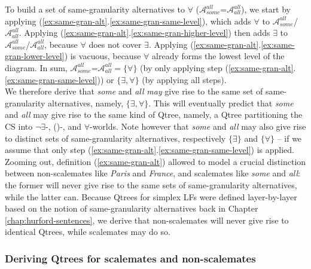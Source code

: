 	To build a set of same-granularity alternatives to $\forall$ ($\mathcal{A}_{\textit{some}}^{\textit{all}}$=$\mathcal{A}_{\textit{all}}^{\textit{all}}$), we start by applying (\ref{ex:same-gran-alt}.\ref{ex:same-gran-same-level}), which adds $\forall$ to $\mathcal{A}_{\textit{some}}^{\textit{all}}$/$\mathcal{A}_{\textit{all}}^{\textit{all}}$. Applying (\ref{ex:same-gran-alt}.\ref{ex:same-gran-higher-level}) then adds $\exists$ to $\mathcal{A}_{\textit{some}}^{\textit{all}}$/$\mathcal{A}_{\textit{all}}^{\textit{all}}$, because $\forall$ does not cover $\exists$. Applying (\ref{ex:same-gran-alt}.\ref{ex:same-gran-lower-level}) is vacuous, because $\forall$ already forms the lowest level of the diagram. In sum, $\mathcal{A}_{\textit{some}}^{\textit{all}}$=$\mathcal{A}_{\textit{all}}^{\textit{all}} = \lbrace\forall\rbrace$ (by only applying step (\ref{ex:same-gran-alt}.\ref{ex:same-gran-same-level})) or $\lbrace\exists, \forall\rbrace$ (by applying all steps).\\
	
	
	We therefore derive that \textit{some} and \textit{all} \textit{may} give rise to the same set of same-granularity alternatives, namely, $\lbrace \exists, \forall\rbrace$. This will eventually predict that \textit{some} and \textit{all} may give rise to the same kind of Qtree, namely, a Qtree partitioning the CS into $\neg\exists$-, (\sbna)-, and $\forall$-worlds. Note however that \textit{some} and \textit{all} may also give rise to distinct sets of same-granularity alternatives, respectively $\lbrace \exists\rbrace$ and $\lbrace\forall\rbrace$ -- if we assume that only step (\ref{ex:same-gran-alt}.\ref{ex:same-gran-same-level}) is applied. Zooming out, definition (\ref{ex:same-gran-alt}) allowed to model a crucial distinction between non-scalemates like \textit{Paris} and \textit{France}, and scalemates like \textit{some} and \textit{all}: the former will never give rise to the same sets of same-granularity alternatives, while the latter can. Because Qtrees for simplex LFs were defined layer-by-layer based on the notion of same-granularity alternatives back in Chapter \ref{chap:hurford-sentences}, we derive that non-scalemates will never give rise to identical Qtrees, while scalemates may do so.
	
	\subsubsection{Deriving Qtrees for scalemates and non-scalemates}\label{sec:qtrees-scalemates-non-scalemates}
	
